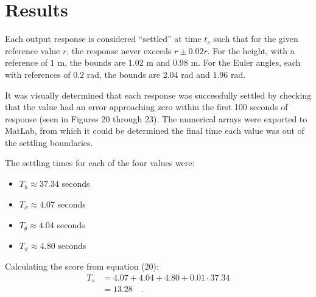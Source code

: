 \section*{Results}

Each output response is considered ``settled'' at time $t_s$ such that for the given reference value $r$, the response never exceeds $r \pm 0.02r$. For the height, with a reference of $1$ m, the bounds are $1.02$ m and $0.98$ m. For the Euler angles, each with references of $0.2$ rad, the bounds are $2.04$ rad and $1.96$ rad.

It was visually determined that each response was successfully settled by checking that the value had an error approaching zero within the first 100 seconds of response (seen in Figures 20 through 23). The numerical arrays were exported to MatLab, from which it could be determined the final time each value was out of the settling boundaries.

The settling times for each of the four values were:
\begin{itemize}
    \item $T_h \approx 37.34$ seconds
    \item $T_\phi \approx 4.07$ seconds
    \item $T_\theta \approx 4.04$ seconds
    \item $T_\psi \approx 4.80$ seconds
\end{itemize}

Calculating the score from equation (20):
\begin{align*}
    T_s &= 4.07 + 4.04 + 4.80 + 0.01 \cdot 37.34 \\
        &= \boxed{13.28} \quad .
\end{align*}